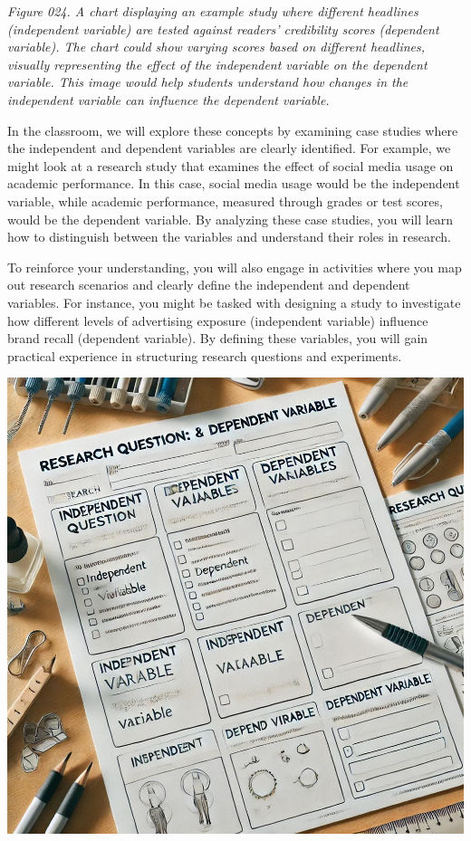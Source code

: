 \documentclass[
]{book}
\begin{document}
\emph{Figure 024. A chart displaying an example study where different headlines (independent variable) are tested against readers' credibility scores (dependent variable). The chart could show varying scores based on different headlines, visually representing the effect of the independent variable on the dependent variable. This image would help students understand how changes in the independent variable can influence the dependent variable.}

In the classroom, we will explore these concepts by examining case studies where the independent and dependent variables are clearly identified. For example, we might look at a research study that examines the effect of social media usage on academic performance. In this case, social media usage would be the independent variable, while academic performance, measured through grades or test scores, would be the dependent variable. By analyzing these case studies, you will learn how to distinguish between the variables and understand their roles in research.

To reinforce your understanding, you will also engage in activities where you map out research scenarios and clearly define the independent and dependent variables. For instance, you might be tasked with designing a study to investigate how different levels of advertising exposure (independent variable) influence brand recall (dependent variable). By defining these variables, you will gain practical experience in structuring research questions and experiments.

\includegraphics[width=1\linewidth,height=\textheight,keepaspectratio]{images/fig025.jpg}
\end{document}

